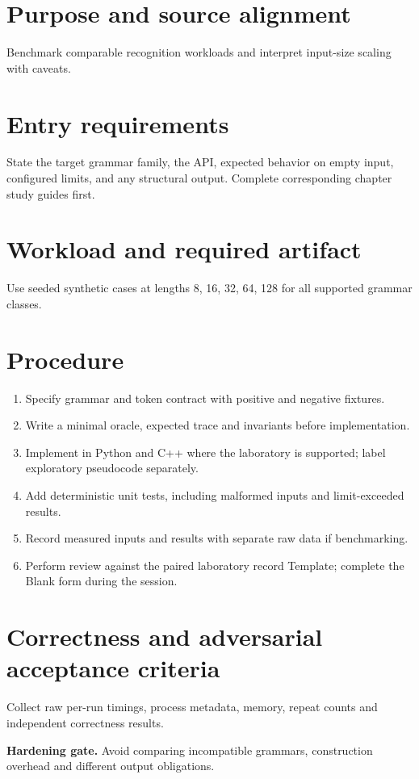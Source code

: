 \documentclass[11pt,letterpaper]{article}
\begin{document}
\makedoctitle\makedocsummary
\tableofcontents\clearpage
\section{Purpose and source alignment}
Benchmark comparable recognition workloads and interpret input-size scaling with caveats.
\section{Entry requirements}
State the target grammar family, the API, expected behavior on empty input, configured limits, and any structural output. Complete corresponding chapter study guides first.
\section{Workload and required artifact}
Use seeded synthetic cases at lengths 8, 16, 32, 64, 128 for all supported grammar classes.
\section{Procedure}
\begin{enumerate}\item Specify grammar and token contract with positive and negative fixtures.\item Write a minimal oracle, expected trace and invariants before implementation.\item Implement in Python and C++ where the laboratory is supported; label exploratory pseudocode separately.\item Add deterministic unit tests, including malformed inputs and limit-exceeded results.\item Record measured inputs and results with separate raw data if benchmarking.\item Perform review against the paired laboratory record Template; complete the Blank form during the session.\end{enumerate}
\section{Correctness and adversarial acceptance criteria}
Collect raw per-run timings, process metadata, memory, repeat counts and independent correctness results.\par\textbf{Hardening gate.} Avoid comparing incompatible grammars, construction overhead and different output obligations.
\end{document}
